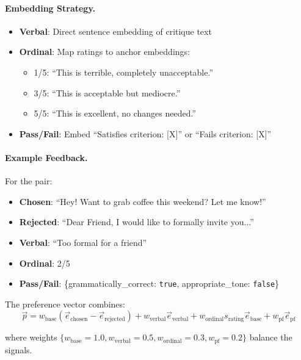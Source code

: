 \paragraph{Embedding Strategy.}
\begin{itemize}
    \item \textbf{Verbal}: Direct sentence embedding of critique text
    \item \textbf{Ordinal}: Map ratings to anchor embeddings:
    \begin{itemize}
        \item 1/5: ``This is terrible, completely unacceptable.''
        \item 3/5: ``This is acceptable but mediocre.''
        \item 5/5: ``This is excellent, no changes needed.''
    \end{itemize}
    \item \textbf{Pass/Fail}: Embed ``Satisfies criterion: [X]'' or ``Fails criterion: [X]''
\end{itemize}

\paragraph{Example Feedback.}
For the pair:
\begin{itemize}
    \item \textbf{Chosen}: ``Hey! Want to grab coffee this weekend? Let me know!''
    \item \textbf{Rejected}: ``Dear Friend, I would like to formally invite you...''
    \item \textbf{Verbal}: ``Too formal for a friend''
    \item \textbf{Ordinal}: 2/5
    \item \textbf{Pass/Fail}: \{grammatically\_correct: \texttt{true}, appropriate\_tone: \texttt{false}\}
\end{itemize}

The preference vector combines:
\begin{equation}
\vec{p} = w_{\text{base}} (\vec{e}_{\text{chosen}} - \vec{e}_{\text{rejected}}) + w_{\text{verbal}} \vec{e}_{\text{verbal}} + w_{\text{ordinal}} s_{\text{rating}} \vec{e}_{\text{base}} + w_{\text{pf}} \vec{e}_{\text{pf}}
\end{equation}

where weights $\{w_{\text{base}}=1.0, w_{\text{verbal}}=0.5, w_{\text{ordinal}}=0.3, w_{\text{pf}}=0.2\}$ balance the signals.


